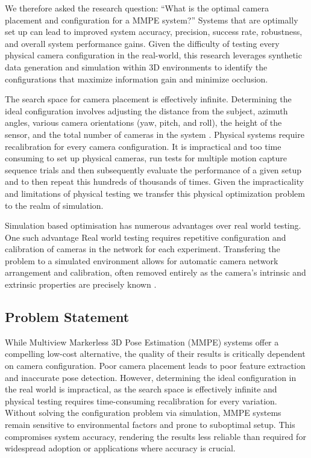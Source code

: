 We therefore asked the research question: ``What is the optimal camera placement and configuration for a MMPE system?'' Systems that are optimally set up can lead to improved system accuracy, precision, success rate, robustness, and overall system performance gains. Given the difficulty of testing every physical camera configuration in the real-world, this research leverages synthetic data generation and simulation within 3D environments to identify the configurations that maximize information gain and minimize occlusion.

The search space for camera placement is effectively infinite. Determining the ideal configuration involves adjusting the distance from the subject, azimuth angles, various camera orientations (yaw, pitch, and roll), the height of the sensor, and the total number of cameras in the system \cite{zhao2013approximate}. Physical systems require recalibration for every camera configuration. It is impractical and too time consuming to set up physical cameras, run tests for multiple motion capture sequence trials and then subsequently evaluate the performance of a given setup and to then repeat this hundreds of thousands of times. \cite{jorgensen2018simulation}
Given the impracticality and limitations of physical testing we transfer this physical optimization problem to the realm of simulation.

Simulation based optimisation has numerous advantages over real world testing. One such advantage Real world testing requires repetitive configuration and calibration of cameras in the network for each experiment.
Transfering the problem to a simulated environment allows for automatic camera network arrangement and calibration, often removed entirely as the camera's intrinsic and extrinsic properties are precisely known \cite{jorgensen2018simulation}.


\subsection{Problem Statement}
\label{sec:problemstatement}

While Multiview Markerless 3D Pose Estimation (MMPE) systems offer a compelling low-cost alternative, the quality of their results is critically dependent on camera configuration. Poor camera placement leads to poor feature extraction and inaccurate pose detection. However, determining the ideal configuration in the real world is impractical, as the search space is effectively infinite and physical testing requires time-consuming recalibration for every variation. Without solving the configuration problem via simulation, MMPE systems remain sensitive to environmental factors and prone to suboptimal setup. This compromises system accuracy, rendering the results less reliable than required for widespread adoption or applications where accuracy is crucial.

